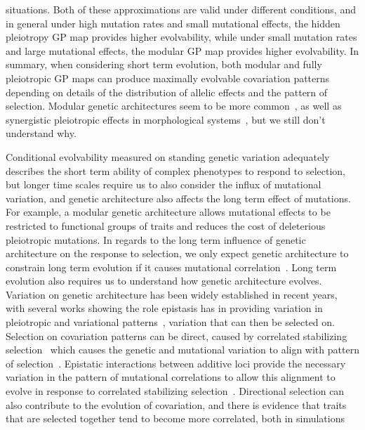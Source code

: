 \begin{refsection}
situations. Both of these approximations are valid under different conditions,
and in general under high mutation rates and small mutational effects, the
hidden pleiotropy GP map provides higher evolvability, while under small
mutation rates and large mutational effects, the modular GP map provides
higher evolvability. In summary, when considering short term evolution, both
modular and fully pleiotropic GP maps can produce maximally evolvable
covariation patterns depending on details of the distribution of allelic
effects and the pattern of selection. Modular genetic architectures seem to be
more common~\parencite{Wagner2007-cx}, as well as synergistic pleiotropic
effects in morphological systems~\parencite{Kenney-Hunt2008-bd}, but we still
don't understand why.

Conditional evolvability measured on standing genetic variation adequately
describes the short term ability of complex phenotypes to respond to
selection, but longer time scales require us to also consider the influx of
mutational variation, and genetic architecture also affects the long term
effect of mutations. For example, a modular genetic architecture allows
mutational effects to be restricted to functional groups of traits and reduces
the cost of deleterious pleiotropic mutations. In regards to the long term
influence of genetic architecture on the response to selection, we only expect
genetic architecture to constrain long term evolution if it causes mutational
correlation~\parencite{Chebib2017-sv}. Long term evolution also requires us to
understand how genetic architecture evolves. Variation on genetic architecture
has been widely established in recent years, with several works showing the
role epistasis has in providing variation in pleiotropic and variational
patterns~\parencite{Pavlicev2015-up, Cheverud1996-fm, Cheverud2004-qr,
Wolf2006-xt, Pavlicev2008-jy}, variation that can then be selected on.
Selection on covariation patterns can be direct, caused by correlated
stabilizing selection~\parencite{Burger1994-nv} which causes the genetic and
mutational variation to align with pattern of
selection~\parencite{Cheverud1984-mi}. Epistatic interactions between additive
loci provide the necessary variation in the pattern of mutational correlations
to allow this alignment to evolve in response to correlated stabilizing
selection~\parencite{Jones2014-wj}. Directional selection can also contribute
to the evolution of covariation, and there is evidence that traits that are
selected together tend to become more correlated, both in
simulations~\parencite{Pavlicev2011-wz, Melo2015-bk, Jones2004-be,
}
\end{refsection}
